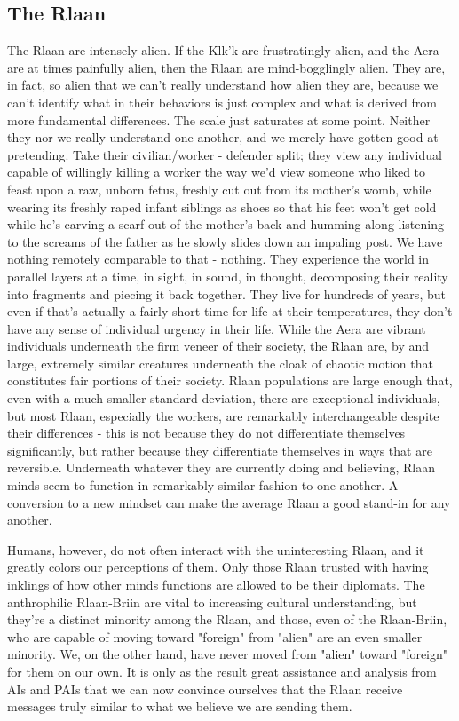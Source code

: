 \subsection{The Rlaan}

The Rlaan are intensely alien. If the Klk'k are frustratingly alien,
and the Aera are at times painfully alien, then the Rlaan are
mind-bogglingly alien. They are, in fact, so alien that we can't
really understand how alien they are, because we can't identify what
in their behaviors is just complex and what is derived from more
fundamental differences. The scale just saturates at some
point. Neither they nor we really understand one another, and we
merely have gotten good at pretending. Take their civilian/worker -
defender split; they view any individual capable of willingly killing
a worker the way we'd view someone who liked to feast upon a raw,
unborn fetus, freshly cut out from its mother's womb, while wearing
its freshly raped infant siblings as shoes so that his feet won't get
cold while he's carving a scarf out of the mother's back and humming
along listening to the screams of the father as he slowly slides down
an impaling post. We have nothing remotely comparable to that -
nothing. They experience the world in parallel layers at a time, in
sight, in sound, in thought, decomposing their reality into fragments
and piecing it back together. They live for hundreds of years, but even
if that's actually a fairly short time for life at their temperatures,
they don't have any sense of individual urgency in their life. While
the Aera are vibrant individuals underneath the firm veneer of their
society, the Rlaan are, by and large, extremely similar creatures
underneath the cloak of chaotic motion that constitutes fair portions
of their society. Rlaan populations are large enough that, even with a
much smaller standard deviation, there are exceptional individuals,
but most Rlaan, especially the workers, are remarkably interchangeable
despite their differences - this is not because they do not
differentiate themselves significantly, but rather because they
differentiate themselves in ways that are reversible. Underneath
whatever they are currently doing and believing, Rlaan minds seem to
function in remarkably similar fashion to one another. A conversion to
a new mindset can make the average Rlaan a good stand-in for any
another.

Humans, however, do not often interact with the uninteresting Rlaan,
and it greatly colors our perceptions of them. Only those Rlaan
trusted with having inklings of how other minds functions are allowed
to be their diplomats. The anthrophilic Rlaan-Briin are vital to
increasing cultural understanding, but they're a distinct minority
among the Rlaan, and those, even of the Rlaan-Briin, who are capable
of moving toward "foreign" from "alien" are an even smaller
minority. We, on the other hand, have never moved from "alien" toward
"foreign" for them on our own. It is only as the result great
assistance and analysis from AIs and PAIs that we can now convince
ourselves that the Rlaan receive messages truly similar to what we
believe we are sending them.

